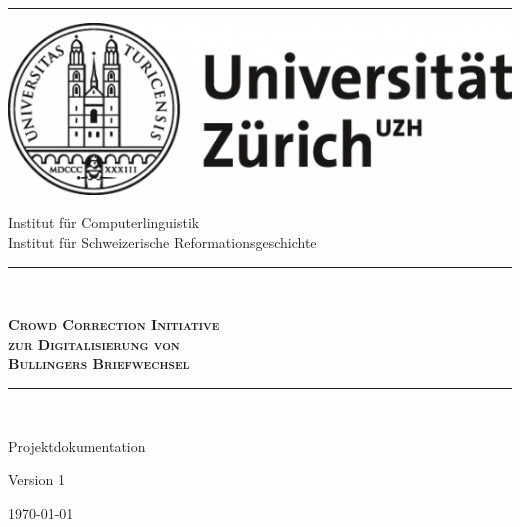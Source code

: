 \thispagestyle{empty}  %




\vspace*{-2cm}
\noindent\rule{1\textwidth}{0.5pt}

\vspace*{0.2cm}
\begin{minipage}[t]{0.4\textwidth}
\begin{flushleft}
\hspace*{-0.4cm}\includegraphics[width=1\textwidth]{Bilder/UZH_logo.png}
\end{flushleft}
\end{minipage}
\begin{minipage}[t]{0.54\textwidth}
\begin{flushright}
Institut für Computerlinguistik\\
Institut für Schweizerische Reformationsgeschichte
\end{flushright}
\end{minipage}

\vspace*{0.3cm}
\noindent\rule{1\textwidth}{0.5pt}\\


\begin{center}
\vspace*{0.5cm}
\textbf{{\Huge\textsc{
Crowd Correction Initiative\\
zur Digitalisierung von\\
Bullingers Briefwechsel\\
}}}

\rule{0.72\textwidth}{3pt}\\
\begin{Large}

Projektdokumentation

\vfill


\vspace*{1cm}
Version 1

\medskip
\today

\end{Large}
\end{center}

